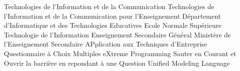 

 {Technologies de l'Information et de la Communication}
 {Technologies de l'Information et de la Communication pour l'Enseignement}
 {Département d'Informatique et des Technologies Educatives}
 {Ecole Normale Supérieure}
 {Technologie de l'Information}
 {Enseignement Secondaire Général}
 {Ministère de l'Enseignement Secondaire}
 {APplication aux Techniques d'Entreprise}
 {Questionnaire à Choix Multiples }
 {eXtreme Programming }
 {Sauter en Courant et Ouvrir la barrière en repondant à une Question}
 {Unified Modeling Language}
